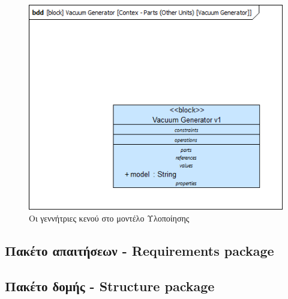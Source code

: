 \documentclass[a4paper,12pt,twoside]{report}
\begin{document}
{\begin{appendices}
				\begin{figure}[hp]
					\centering
					\includegraphics[scale=0.50]{DesignModel_Contex-Parts(OtherUnits)[VacuumGenerator].png}
					\caption{Οι γεννήτριες κενού στο μοντέλο Υλοποίησης}
					\label{φωτ:Οι γεννήτριες κενού στο μοντέλο Υλοποίησης}
				\end{figure}
				
			\FloatBarrier
			\subsection{Πακέτο απαιτήσεων - Requirements package}
			
			\FloatBarrier
			\subsection{Πακέτο δομής - Structure package}
			

\end{appendices}}
\end{document}
